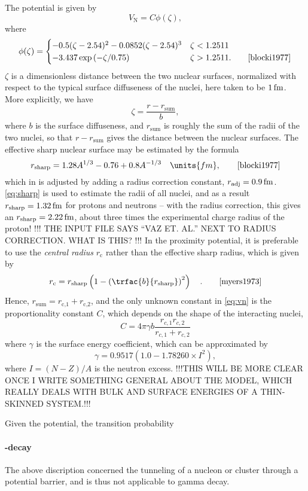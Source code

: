 The potential is given by
\begin{equation}
V_\text{N} = C \phi(\zeta),\label{eq:vn}
\end{equation}
where
\begin{equation}
\phi(\zeta)= \begin{cases}-0.5(\zeta-2.54)^2-0.0852(\zeta-2.54)^3 & \zeta < 1.2511 \\
-3.437\exp{(-\zeta/0.75)} & \zeta > 1.2511.\qquad\cite{blocki1977}
\end{cases}
\end{equation}
$\zeta$ is a dimensionless distance between the two nuclear surfaces, normalized with respect to the typical surface diffuseness of the nuclei, here taken to be $\unit[1]{fm}$\cite{blocki1977}. More explicitly, we have
\begin{equation}
\zeta = \frac{r - r_\text{sum}}{b},
\end{equation}
where $b$ is the surface diffuseness, and $r_\text{sum}$ is roughly the sum of the radii of the two nuclei, so that $r-r_\text{sum}$ gives the distance between the nuclear surfaces\cite{blocki1977}. The effective sharp nuclear surface may be estimated by the formula
\begin{equation}
r_\text{sharp} = 1.28 A^{1/3} - 0.76 + 0.8 A^{-1/3}\quad\units{fm},\qquad\cite{blocki1977}\label{eq:sharp}
\end{equation}
which in  is adjusted by adding a radius correction constant, $r_\text{adj} = \unit[0.9]{fm}$.
\eqref{eq:sharp} is used to estimate the radii of all nuclei, and as a result $r_\text{sharp}=\unit[1.32]{fm}$ for protons and neutrons -- with the radius correction, this gives an $r_\text{sharp}=\unit[2.22]{fm}$, about three times the experimental charge radius of the proton!
!!!  THE INPUT FILE SAYS ``VAZ ET. AL.'' NEXT TO RADIUS CORRECTION. WHAT IS THIS? !!!
In the proximity potential, it is preferable to use the \emph{central radius} $r_\text{c}$ rather than the effective sharp radius\cite{blocki1977}, which is given by 
\begin{equation}
r_\text{c} =r_\text{sharp} \left(1-\left(\trfac{b}{r_\text{sharp}}\right)^2\right)\quad.\qquad\cite{myers1973}
\end{equation}
Hence, $r_\text{sum} = r_\text{c,1}+r_\text{c,2}$, and the only unknown constant in \autoref{eq:vn} is the proportionality constant $C$, which depends on the shape of the interacting nuclei, 
\begin{equation}
C = 4\pi \gamma b \frac{r_{c,1} r_{c,2}}{r_{c,1} + r_{c,2}}
\end{equation}
where $\gamma$ is the surface energy coefficient, which can be approximated by
\begin{equation}
\gamma= 0.9517 (1.0 - 1.78260 \times I^2),
\end{equation}
where $I=(N-Z)/A$ is the neutron excess.
!!!THIS WILL BE MORE CLEAR ONCE I WRITE SOMETHING GENERAL ABOUT THE MODEL, WHICH REALLY DEALS WITH BULK AND SURFACE ENERGIES OF A THIN-SKINNED SYSTEM.!!!

Given the potential, the transition probability

\paragraph{\gamma-decay}
The above discription concerned the tunneling of a nucleon or cluster through a potential barrier, and is thus not applicable to gamma decay.